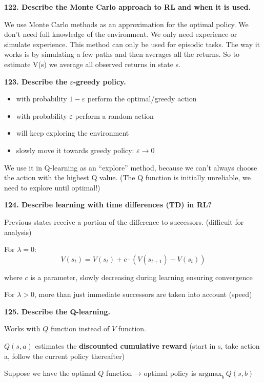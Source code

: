 \textbf{122. Describe the Monte Carlo approach to RL and when it is
used.}

We use Monte Carlo methods as an approximation for the optimal policy.
We don't need full knowledge of the environment. We only need experience
or simulate experience. This method can only be used for episodic tasks.
The way it works is by simulating a few paths and then averages all the
returns. So to estimate V(s) we average all observed returns in state s.

\textbf{123. Describe the $\varepsilon$-greedy policy.}

\begin{itemize}
\item with probability $1-\varepsilon$ perform the optimal/greedy action
\item with probability $\varepsilon$ perform a random action
\item will keep exploring the environment
\item slowly move it towards greedy policy: $\varepsilon \to 0$
\end{itemize}

We use it in Q-learning as an ``explore'' method, because we can't
always choose the action with the highest Q value. (The Q function is
initially unreliable, we need to explore until optimal!)

\textbf{124. Describe learning with time differences (TD) in RL?}

Previous states receive a portion of the difference to successors.
(difficult for analysis)

For $\lambda = 0$:
\[ V(s_t) = V(s_t) + c \cdot \left(V(s_{t+1}) - V(s_t) \right)\]

where $c$ is a parameter, slowly decreasing during learning ensuring convergence

For $\lambda > 0$, more than just immediate successors are taken into account (speed)

\textbf{125. Describe the Q-learning.}

Works with $Q$ function instead of $V$ function.

$Q(s, a)$ estimates the \textbf{discounted cumulative reward} (start in s,
take action a, follow the current policy thereafter)

Suppose we have the optimal $Q$ function → optimal policy is $\text{argmax}_b\ Q(s, b)$

